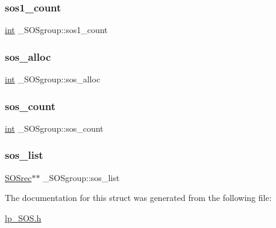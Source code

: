 \subsubsection{\texorpdfstring{sos1\+\_\+count}{sos1\_count}}
{\footnotesize\ttfamily \hyperlink{lp__lib_8h_adeb9ec6400320e4923ac9d836d509ddb}{int} \+\_\+\+S\+O\+Sgroup\+::sos1\+\_\+count}

\mbox{\label{struct___s_o_sgroup_a615470a1e9fee9f82c0e4d41605df32d}} 
\subsubsection{\texorpdfstring{sos\+\_\+alloc}{sos\_alloc}}
{\footnotesize\ttfamily \hyperlink{lp__lib_8h_adeb9ec6400320e4923ac9d836d509ddb}{int} \+\_\+\+S\+O\+Sgroup\+::sos\+\_\+alloc}

\mbox{\label{struct___s_o_sgroup_a71aaf75c7761c386bdf6dbe58a86c62d}} 
\subsubsection{\texorpdfstring{sos\+\_\+count}{sos\_count}}
{\footnotesize\ttfamily \hyperlink{lp__lib_8h_adeb9ec6400320e4923ac9d836d509ddb}{int} \+\_\+\+S\+O\+Sgroup\+::sos\+\_\+count}

\mbox{\label{struct___s_o_sgroup_af83cfe819efe1ec662cb71bda7a04d16}} 
\subsubsection{\texorpdfstring{sos\+\_\+list}{sos\_list}}
{\footnotesize\ttfamily \hyperlink{lp___s_o_s_8h_a57f73546a58296a267805477c139d2af}{S\+O\+Srec}$\ast$$\ast$ \+\_\+\+S\+O\+Sgroup\+::sos\+\_\+list}



The documentation for this struct was generated from the following file\+:\begin{DoxyCompactItemize}
\item 
\hyperlink{lp___s_o_s_8h}{lp\+\_\+\+S\+O\+S.\+h}\end{DoxyCompactItemize}
